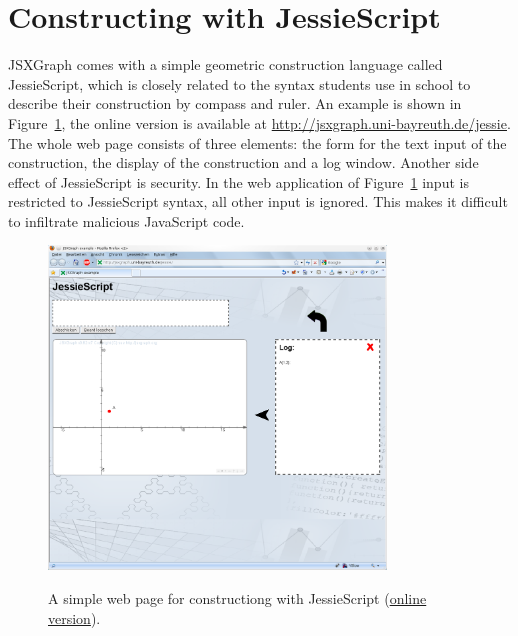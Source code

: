 \documentclass[12pt,a4paper]{article}%
\begin{document}
\section{Constructing with JessieScript}
JSXGraph comes with a simple geometric construction language called JessieScript, which is closely related to the syntax students use in school to describe their construction by compass and ruler. An example is shown in Figure~\ref{fig:jessiescript}, the online version is available at 
\href{http://jsxgraph.uni-bayreuth.de/jessie}{http://jsxgraph.uni-bayreuth.de/jessie}. 
The whole web page consists of three elements: the form for the text input of the construction, the display of the construction and a log window. 
Another side effect of JessieScript is security. In the web application of Figure~\ref{fig:jessiescript}
input is restricted to 
JessieScript syntax, all other input is ignored. This makes it difficult to 
infiltrate malicious JavaScript code.
\begin{figure}[ht]
\begin{center}
\includegraphics[width=0.8\textwidth]{jessiescript.png}\\
\caption{A simple web page for constructiong with JessieScript 
(\href{http://jsxgraph.uni-bayreuth.de/jessie/}{online version}).}\label{fig:jessiescript}
\end{center}
\end{figure}
\end{document}
